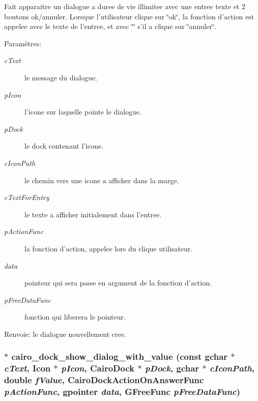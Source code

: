 Fait apparaitre un dialogue a duree de vie illimitee avec une entree texte et 2 boutons ok/annuler. Lorsque l'utilisateur clique sur \char`\"{}ok\char`\"{}, la fonction d'action est appelee avec le texte de l'entree, et avec \char`\"{}\char`\"{} s'il a clique sur \char`\"{}annuler\char`\"{}. \begin{Desc}
\item[Param\`{e}tres:]
\begin{description}
\item[{\em c\-Text}]le message du dialogue. \item[{\em p\-Icon}]l'icone sur laquelle pointe le dialogue. \item[{\em p\-Dock}]le dock contenant l'icone. \item[{\em c\-Icon\-Path}]le chemin vers une icone a afficher dans la marge. \item[{\em c\-Text\-For\-Entry}]le texte a afficher initialement dans l'entree. \item[{\em p\-Action\-Func}]la fonction d'action, appelee lors du clique utilisateur. \item[{\em data}]pointeur qui sera passe en argument de la fonction d'action. \item[{\em p\-Free\-Data\-Func}]fonction qui liberera le pointeur. \end{description}
\end{Desc}
\begin{Desc}
\item[Renvoie:]le dialogue nouvellement cree. \end{Desc}
\subsubsection{$\ast$ cairo\_\-dock\_\-show\_\-dialog\_\-with\_\-value (const gchar $\ast$ {\em c\-Text}, {\bf Icon} $\ast$ {\em p\-Icon}, {\bf Cairo\-Dock} $\ast$ {\em p\-Dock}, gchar $\ast$ {\em c\-Icon\-Path}, double {\em f\-Value}, {\bf Cairo\-Dock\-Action\-On\-Answer\-Func} {\em p\-Action\-Func}, gpointer {\em data}, GFree\-Func {\em p\-Free\-Data\-Func})}\label{cairo-dock-dialogs_8c_bf1e8e584b3cd7daa42d433659ac2982}


